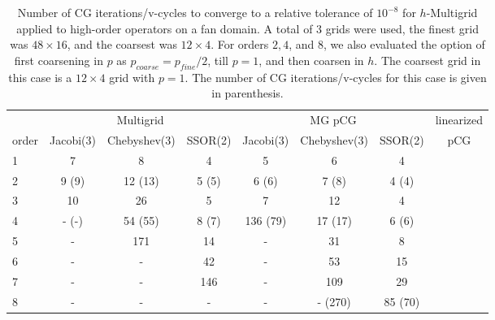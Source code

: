 \begin{table}
  \caption{\label{tab:fan} Number of CG iterations/v-cycles to converge to a relative tolerance of $10^{-8}$ for $h$-Multigrid applied to high-order operators on a fan domain. A total of 3 grids were used, the finest grid was $48\times 16$, and the coarsest was $12\times 4$. For orders $2,4$, and $8$, we also evaluated the option of first coarsening in $p$ as $p_{coarse} = p_{fine}/2$, till $p=1$, and then coarsen in $h$. The coarsest grid in this case is a $12\times 4$ grid with $p=1$. The number of CG iterations/v-cycles for this case is given in parenthesis.}
		\centering
    \begin{tabular}{|l|c|c|c|c|c|c|c|} 
\hline
                     & \multicolumn{3}{c|}{Multigrid} & \multicolumn{3}{c|}{MG pCG} &          linearized    \\
\cline{2-7}
			order &          \scriptsize Jacobi(3) &   \scriptsize  Chebyshev(3) & \scriptsize SSOR(2) & \scriptsize Jacobi(3) & \scriptsize  Chebyshev(3) & \scriptsize SSOR(2) & pCG\\
\hline
                   1 &                              7 &                           8 &                   4 &                     5 &                         6 &                   4 &    \\
                   2 &                          9 (9) &                     12 (13) &               5 (5) &                 6 (6) &                     7 (8) &               4 (4) &    \\
                   3 &                             10 &                          26 &                   5 &                     7 &                        12 &                   4 &    \\
                   4 &                          - (-) &                     54 (55) &               8 (7) &              136 (79) &                   17 (17) &               6 (6) &    \\
                   5 &                              - &                         171 &                  14 &                     - &                        31 &                   8 &    \\
                   6 &                              - &                           - &                  42 &                     - &                        53 &                  15 &    \\
                   7 &                              - &                           - &                 146 &                     - &                       109 &                  29 &    \\
                   8 &                              - &                           - &                   - &                     - &                   - (270) &             85 (70) &    \\
\hline
	  \end{tabular}
\end{table}


